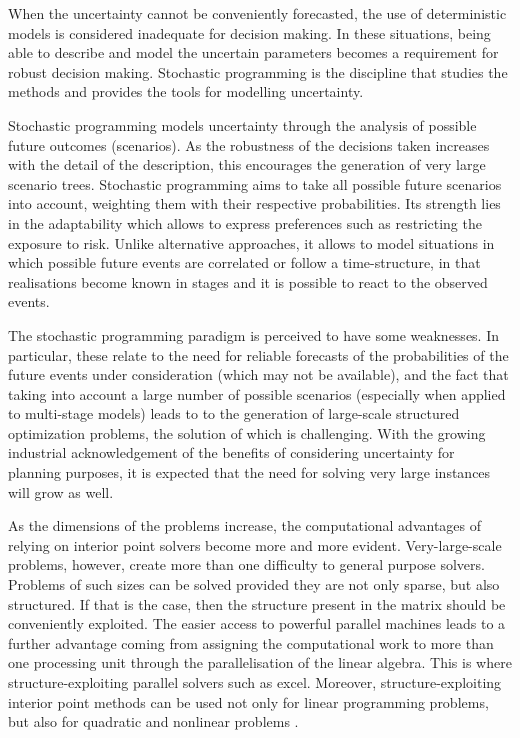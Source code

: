 
When the uncertainty cannot be conveniently forecasted, the use of 
deterministic models is considered inadequate for decision making. In 
these situations, being able to describe and model the uncertain parameters
becomes a requirement for robust decision making. Stochastic 
programming is the discipline that 
studies the methods and provides the tools for modelling uncertainty.

Stochastic programming models uncertainty through the analysis 
of possible future outcomes (scenarios). 
As the robustness of the decisions taken increases with the detail of the 
description, this encourages the generation of very large scenario trees.
Stochastic programming aims to take all possible future scenarios 
into account, weighting them
with their respective probabilities. Its strength lies in the
adaptability which allows to express preferences such as restricting
the exposure to risk. Unlike alternative approaches, it allows to model
situations in which possible future events are correlated or follow a
time-structure, in that realisations become known in stages and it is
possible to react to the observed events.

The stochastic programming paradigm is perceived to have
some weaknesses.
In particular, these relate to the need for reliable forecasts
of the probabilities of the future events under consideration
(which may not be available), and the fact that 
taking into account a large number of possible scenarios 
(especially when applied to multi-stage models) leads to
to the generation of large-scale structured optimization problems,
the solution of which is challenging. 
With the growing industrial acknowledgement of the benefits of 
considering uncertainty for planning purposes, it is expected that the 
need for solving very large instances will grow as well.

As the dimensions of the problems increase, the computational advantages 
of relying on interior point solvers become more and more evident. 
Very-large-scale problems, however, create more than one difficulty to general 
purpose solvers.
Problems of such sizes can be solved provided they are not only sparse,
but also structured. If that is the case, then the structure present 
in the matrix should be conveniently exploited.
The easier access to powerful parallel machines leads to a 
further advantage coming from assigning the computational work 
to more than one processing unit through the parallelisation of 
the linear algebra.
This is where structure-exploiting parallel solvers such as \OOPS 
\cite{GondzioSarkissian} excel. Moreover, structure-exploiting interior 
point methods can be used not only for linear programming problems, 
but also for quadratic and nonlinear problems \cite{GondzioGrothey07}.

